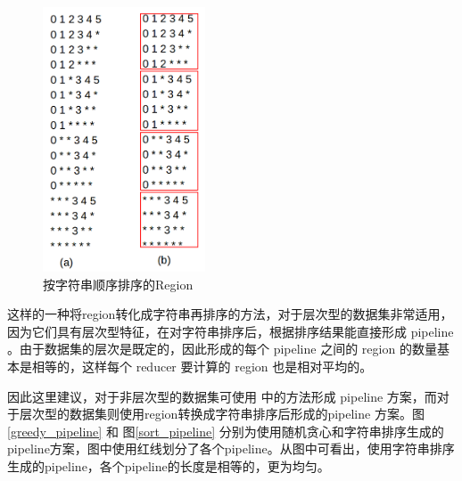 \begin{figure}[!h] 
\centering\includegraphics[width=1.9in]{picture/ch_terasort_mr/sorted_region} 
\caption{按字符串顺序排序的Region}\label{sorted_region} 
\end{figure}

这样的一种将region转化成字符串再排序的方法，对于层次型的数据集非常适用，因为它们具有层次型特征，在对字符串排序后，根据排序结果能直接形成 pipeline 。由于数据集的层次是既定的，因此形成的每个 pipeline 之间的 region 的数量基本是相等的，这样每个 reducer 要计算的 region 也是相对平均的。

因此这里建议，对于非层次型的数据集可使用 \cite{wang2013scalable} 中的方法形成 pipeline 方案，而对于层次型的数据集则使用region转换成字符串排序后形成的pipeline 方案。图\ref{greedy_pipeline} 和 图\ref{sort_pipeline} 分别为使用随机贪心和字符串排序生成的pipeline方案，图中使用红线划分了各个pipeline。从图中可看出，使用字符串排序生成的pipeline，各个pipeline的长度是相等的，更为均匀。


